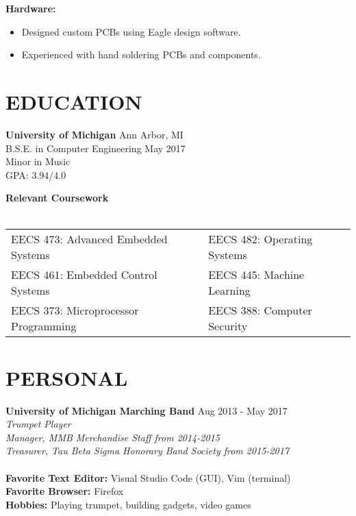 \documentclass[margin,11pt]{res}
\begin{document}
\begin{resume}
\vspace{-10pt}
\textbf{Hardware:}
\begin{itemize}
    \itemsep -2pt
    \item Designed custom PCBs using Eagle design software.
    \item Experienced with hand soldering PCBs and components.
\end{itemize}

\vspace{-10pt}
\section{EDUCATION}
\textbf{University of Michigan} \hfill Ann Arbor, MI\\
B.S.E. in Computer Engineering \hfill May 2017\\
Minor in Music\\
GPA: 3.94/4.0\\
\vspace{-24pt}

\textbf{Relevant Coursework}\\
\vspace{-10pt}
\\
\vspace{-10pt}
\begin{tabular}{l l}
    EECS 473: Advanced Embedded Systems & EECS 482: Operating Systems\\
    EECS 461: Embedded Control Systems & EECS 445: Machine Learning\\
    EECS 373: Microprocessor Programming & EECS 388: Computer Security\\
\end{tabular}

\section{PERSONAL}
\textbf{University of Michigan Marching Band} \hfill Aug 2013 - May 2017\\
\textsl{Trumpet Player}\\
\textsl{Manager, MMB Merchandise Staff from 2014-2015}\\
\textsl{Treasurer, Tau Beta Sigma Honorary Band Society from 2015-2017}\\
\\
\textbf{Favorite Text Editor:} Visual Studio Code (GUI), Vim (terminal)\\
\textbf{Favorite Browser:} Firefox\\
\textbf{Hobbies:} Playing trumpet, building gadgets, video games


\end{resume}
\end{document}

